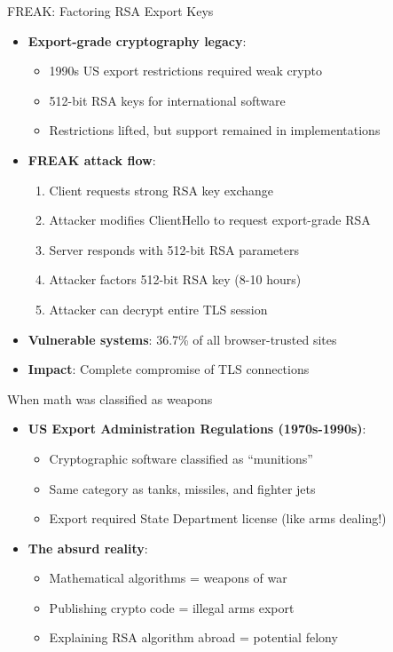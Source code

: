 \documentclass[aspectratio=169, lualatex, handout]{beamer}
\begin{document}
\begin{frame}{FREAK: Factoring RSA Export Keys}
	\begin{itemize}[<+->]
		\item \textbf{Export-grade cryptography legacy}:
		      \begin{itemize}
			      \item 1990s US export restrictions required weak crypto
			      \item 512-bit RSA keys for international software
			      \item Restrictions lifted, but support remained in implementations
		      \end{itemize}
		\item \textbf{FREAK attack flow}:
		      \begin{enumerate}
			      \item Client requests strong RSA key exchange
			      \item Attacker modifies ClientHello to request export-grade RSA
			      \item Server responds with 512-bit RSA parameters
			      \item Attacker factors 512-bit RSA key (8-10 hours)
			      \item Attacker can decrypt entire TLS session
		      \end{enumerate}
		\item \textbf{Vulnerable systems}: 36.7\% of all browser-trusted sites
		\item \textbf{Impact}: Complete compromise of TLS connections
	\end{itemize}
\end{frame}

\begin{frame}{When math was classified as weapons}
	\begin{itemize}[<+->]
		\item \textbf{US Export Administration Regulations (1970s-1990s)}:
		      \begin{itemize}
			      \item Cryptographic software classified as ``munitions''
			      \item Same category as tanks, missiles, and fighter jets
			      \item Export required State Department license (like arms dealing!)
		      \end{itemize}
		\item \textbf{The absurd reality}:
		      \begin{itemize}
			      \item Mathematical algorithms = weapons of war
			      \item Publishing crypto code = illegal arms export
			      \item Explaining RSA algorithm abroad = potential felony
		      \end{itemize}
	\end{itemize}
\end{frame}
\end{document}
